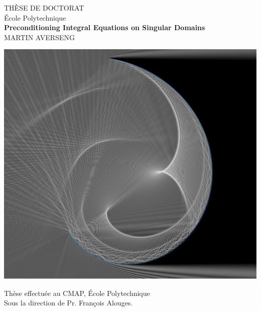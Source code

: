 \documentclass[a4paper]{article}
\begin{document}
	\begin{centering}
		
		{\huge
			TH\`ESE DE DOCTORAT \\
			\vspace{0.3cm}
			\'Ecole Polytechnique\\
			\vspace{30pt}
		}
		{\Huge
			\bf{
				Preconditioning Integral Equations on Singular Domains \\
			}
		}
		\vspace{1cm}
		{\fontsize{16}{19.2} \selectfont \MakeUppercase{MARTIN AVERSENG}} \\
		\vspace{1cm}%
		
		\begin{center}
			\includegraphics[scale=0.65]{images/arcOfSpiral800_3_cropped}
			\vspace{0.5cm}
		\end{center}
		
		\begin{center}
			\Large
			Thèse effectuée au CMAP, \'Ecole Polytechnique\\
			Sous la direction de Pr. François Alouges.\\
		\end{center}
		
	\end{centering}
	\thispagestyle{empty}
\end{document}
